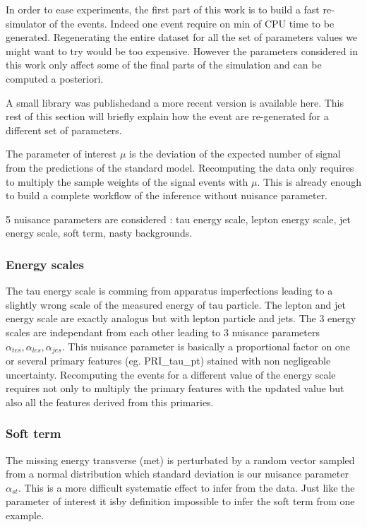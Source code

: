 In order to ease experiments, the first part of this work is to build a fast re-simulator of the events.
Indeed one event require on min of CPU time to be generated.
Regenerating the entire dataset for all the set of parameters values we might want to try would be too expensive.
However the parameters considered in this work only affect some of the final parts of the simulation and can be computed a posteriori.

A small library was published\needcite and a more recent version is available here\needcite.
This rest of this section will briefly explain how the event are re-generated for a different set of parameters.

The parameter of interest $\mu$ is the deviation of the expected number of signal from the predictions of the standard model.
Recomputing the data only requires to multiply the sample weights of the signal events with $\mu$.
This is already enough to build a complete workflow of the inference without nuisance parameter.

5 nuisance parameters are considered : tau energy scale, lepton energy scale, jet energy scale, soft term, nasty backgrounds.



\subsubsection{Energy scales} %
\label{ssub:energy_scales}

The tau energy scale is comming from apparatus imperfections leading to a slightly wrong scale of the measured energy of tau particle.
The lepton and jet energy scale are exactly analogus but with lepton particle and jets.
The 3 energy scales are independant from each other leading to 3 nuisance parameters $\alpha_{tes}, \alpha_{les}, \alpha_{jes}$. 
This nuisance parameter is basically a proportional factor on one or several primary features (eg. PRI\_tau\_pt) stained with non negligeable uncertainty.
Recomputing the events for a different value of the energy scale requires not only to multiply the primary features with the updated value but also all the features derived from this primaries.



\subsubsection{Soft term} %
\label{ssub:soft_term}

The missing energy transverse (met) is perturbated by a random vector sampled from a normal distribution which standard deviation is our nuisance parameter $\alpha_{st}$.
This is a more difficult systematic effect to infer from the data.
Just like the parameter of interest it isby definition impossible to infer the soft term from one example.




